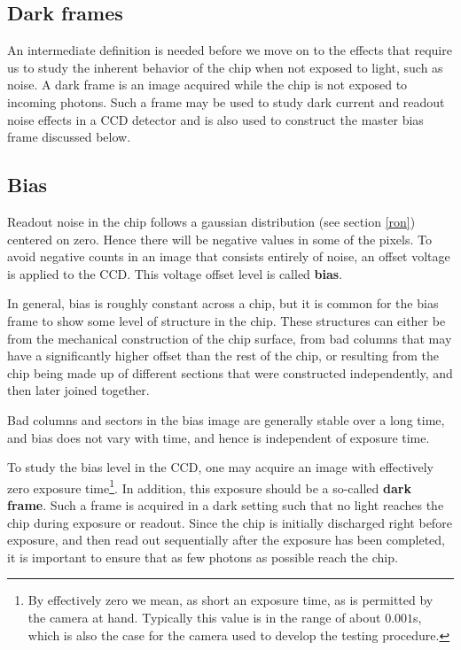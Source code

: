 \documentclass[../main.tex]{subfiles}
\begin{document}
	\subsection{Dark frames}
	An intermediate definition is needed before we move on to the effects that require us to study the inherent behavior of the chip when not exposed to light, such as noise. A dark frame is an image acquired while the chip is not exposed to incoming photons. Such a frame may be used to study dark current and readout noise effects in a CCD detector and is also used to construct the master bias frame discussed below.
	
	\subsection{Bias}
	Readout noise in the chip follows a gaussian distribution (see section \ref{ron}) centered on zero. Hence there will be negative values in some of the pixels. To avoid negative counts in an image that consists entirely of noise, an offset voltage is applied to the CCD. This voltage offset level is called \textbf{bias}. 
	
	In general, bias is roughly constant across a chip, but it is common for the bias frame to show some level of structure in the chip. These structures can either be from the mechanical construction of the chip surface, from bad columns that may have a significantly higher offset than the rest of the chip, or resulting from the chip being made up of different sections that were constructed independently, and then later joined together. 
	
	Bad columns and sectors in the bias image are generally stable over a long time, and bias does not vary with time, and hence is independent of exposure time. 
	
	To study the bias level in the CCD, one may acquire an image with effectively zero exposure time\footnote{By effectively zero we mean, as short an exposure time, as is permitted by the camera at hand. Typically this value is in the range of about $0.001$s, which is also the case for the camera used to develop the testing procedure.}. In addition, this exposure should be a so-called \textbf{dark frame}. Such a frame is acquired in a dark setting such that no light reaches the chip during exposure or readout. Since the chip is initially discharged right before exposure, and then read out sequentially after the exposure has been completed, it is important to ensure that as few photons as possible reach the chip.
	
\end{document}
